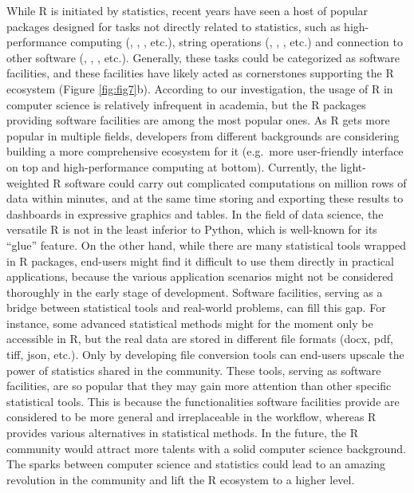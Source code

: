 While R is initiated by statistics, recent years have seen a host of
popular packages designed for tasks not directly related to statistics,
such as high-performance computing (,
, , etc.), string operations
(, , , etc.) and
connection to other software (, ,
, etc.). Generally, these tasks could be categorized
as software facilities, and these facilities have likely acted as
cornerstones supporting the R ecosystem (Figure \ref{fig:fig7}b).
According to our investigation, the usage of R in computer science is
relatively infrequent in academia, but the R packages providing software
facilities are among the most popular ones. As R gets more popular in
multiple fields, developers from different backgrounds are considering
building a more comprehensive ecosystem for it (e.g.~more user-friendly
interface on top and high-performance computing at bottom). Currently,
the light-weighted R software could carry out complicated computations
on million rows of data within minutes, and at the same time storing and
exporting these results to dashboards in expressive graphics and tables.
In the field of data science, the versatile R is not in the least
inferior to Python, which is well-known for its ``glue'' feature. On the
other hand, while there are many statistical tools wrapped in R
packages, end-users might find it difficult to use them directly in
practical applications, because the various application scenarios might
not be considered thoroughly in the early stage of development. Software
facilities, serving as a bridge between statistical tools and real-world
problems, can fill this gap. For instance, some advanced statistical
methods might for the moment only be accessible in R, but the real data
are stored in different file formats (docx, pdf, tiff, json, etc.). Only
by developing file conversion tools can end-users upscale the power of
statistics shared in the community. These tools, serving as software
facilities, are so popular that they may gain more attention than other
specific statistical tools. This is because the functionalities software
facilities provide are considered to be more general and irreplaceable
in the workflow, whereas R provides various alternatives in statistical
methods. In the future, the R community would attract more talents with
a solid computer science background. The sparks between computer science
and statistics could lead to an amazing revolution in the community and
lift the R ecosystem to a higher level.


